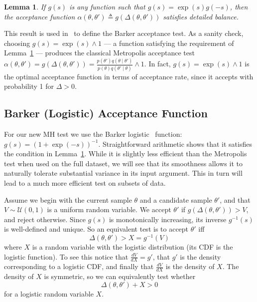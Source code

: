 \documentclass{article}
\newtheorem{lemma}{Lemma}
\begin{document}
\begin{lemma}\label{lem:detailed_balance}
    If $g(s)$ is any function such that $g(s) = \exp(s) g(-s)$, then the
    acceptance function $\alpha(\theta,\theta') \triangleq
    g(\Delta(\theta,\theta'))$ satisfies detailed balance.
\end{lemma}

This result is used in~\cite{Barker65} to define the Barker acceptance test.  As
a sanity check, choosing $g(s) = \exp(s) \wedge 1$ --- a function satisfying the
requirement of Lemma~\ref{lem:detailed_balance} --- produces the classical
Metropolis acceptance test $\alpha(\theta,\theta') = g(\Delta(\theta,\theta')) =
\frac{p(\theta')q(\theta \mid \theta')}{p(\theta)q(\theta' \mid \theta)}\wedge
1$. In fact, $g(s) =\exp(s) \wedge 1$ is the optimal acceptance function in
terms of acceptance rate, since it accepts with probability 1 for $\Delta > 0$.

\subsection{Barker (Logistic) Acceptance Function}\label{ssec:barker_function}
For our new MH test we use the Barker logistic~\cite{Barker65} function:
$g(s)=(1+\exp(-s))^{-1}$. Straightforward arithmetic shows that it satisfies the
condition in Lemma~\ref{lem:detailed_balance}.  While it is slightly less
efficient than the Metropolis test when used on the full dataset, we will see
that its smoothness allows it to naturally tolerate substantial variance in its
input argument. This in turn will lead to a much more efficient test on subsets
of data.

Assume we begin with the current sample $\theta$ and a candidate sample
$\theta'$, and that $V \sim \mathcal{U}(0,1)$ is a uniform random variable. We
accept $\theta'$ if $g(\Delta(\theta,\theta')) > V$, and reject otherwise.
Since $g(s)$ is monotonically increasing, its inverse $g^{-1}(s)$ is
well-defined and unique. So an equivalent test is to accept $\theta'$ iff
\begin{equation}\label{eq:equivalent_test}
    \Delta(\theta,\theta') > X = g^{-1}(V)
\end{equation}
where $X$ is a random variable with the logistic distribution (its CDF is the
logistic function). To see this notice that $\frac{dV}{dX} = g'$, that $g'$ is
the density corresponding to a logistic CDF, and finally that $\frac{dV}{dX}$ is
the density of $X$. The density of $X$ is symmetric, so we can equivalently test
whether
\begin{equation}\label{eq:the_exact_test}
    \Delta(\theta,\theta') + X > 0
\end{equation}
for a logistic random variable $X$.
\end{document}
